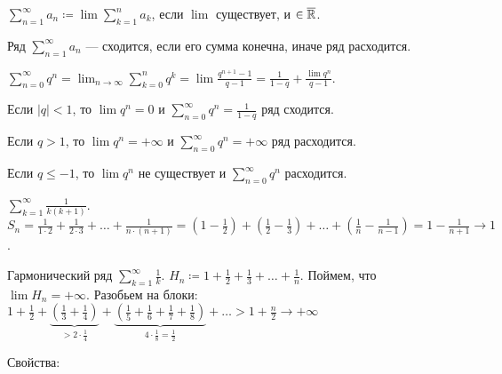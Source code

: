 \begin{definition}
    $\sum_{n=1}^\infty a_n \coloneqq \lim \sum_{k=1}^n a_k$, если $\lim$ существует, и $\in \overline{\mathbb{R}}$.
\end{definition}
\begin{definition}
    Ряд $\sum_{n=1}^\infty a_n$ --- сходится, если его сумма конечна, иначе ряд расходится.
\end{definition}
\begin{example}
    $\sum_{n=0}^\infty q^n = \lim_{n\to\infty} \sum_{k=0}^n q^k = \lim \frac{q^{n+1} - 1}{q-1} = \frac{1}{1 - q} + \frac{\lim q^n}{q-1}$.

    Если $|q| < 1$, то  $\lim q^n = 0$ и  $\sum_{n=0}^\infty q^n = \frac{1}{1 - q}$ ряд сходится.

    Если $q > 1$, то $\lim q^n = +\infty$ и  $\sum_{n=0}^\infty q^n = +\infty$ ряд расходится.

    Если  $q \le -1$, то $\lim q^n$ не существует и  $\sum_{n=0}^\infty q^n$ расходится.
\end{example}
\begin{example}
    $\sum_{k=1}^\infty \frac{1}{k(k+1)}$. $S_n = \frac{1}{1 \cdot 2} + \frac{1}{2 \cdot 3} + \ldots + \frac{1}{n \cdot (n+1)} = \left(1 - \frac{1}{2}\right) + \left(\frac{1}{2} - \frac{1}{3}\right) + \ldots + \left(\frac{1}{n} - \frac{1}{n-1}\right) = 1 - \frac{1}{n + 1} \to 1$.
\end{example}
\begin{example}
    Гармонический ряд $\sum_{k=1}^\infty \frac{1}{k}$. $H_n \coloneqq 1 + \frac{1}{2} + \frac{1}{3} + \ldots + \frac{1}{n}$.
    Поймем, что $\lim H_n = +\infty$. Разобьем на блоки:  $1 + \frac{1}{2} + \underbrace{\left(\frac{1}{3} + \frac{1}{4}\right)}_{ > 2 \cdot \frac{1}{4}} + \underbrace{\left(\frac{1}{5} + \frac{1}{6} + \frac{1}{7} + \frac{1}{8}\right)}_{4 \cdot \frac{1}{8}  = \frac{1}{2}} + \ldots > 1 + \frac{n}{2} \to +\infty$
\end{example}
\slashn
Свойства:
